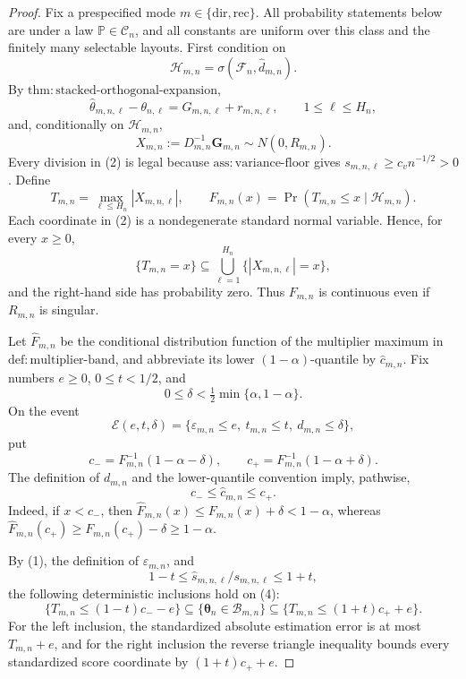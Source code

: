\documentclass{article}
\begin{document}
\begin{proof}
Fix a prespecified mode \(m\in\{\mathrm{dir},\mathrm{rec}\}\).  All probability statements below are under a law \(\mathbb P\in\mathcal C_n\), and all constants are uniform over this class and the finitely many selectable layouts.  First condition on
\[
 \mathcal H_{m,n}=\sigma(\mathcal F_n,\widehat d_{m,n}).
\]
By \(\mathrm{thm{:}stacked\mbox{-}orthogonal\mbox{-}expansion}\),
\[
 \widehat\theta_{m,n,\ell}-\theta_{n,\ell}
 =G_{m,n,\ell}+r_{m,n,\ell},
 \qquad 1\le \ell\le H_n,                                      \tag{1}
\]
and, conditionally on \(\mathcal H_{m,n}\),
\[
 X_{m,n}:=D_{m,n}^{-1}\boldsymbol G_{m,n}
 \sim N(0,R_{m,n}).                                               \tag{2}
\]
Every division in (2) is legal because \(\mathrm{ass{:}variance\mbox{-}floor}\) gives \(s_{m,n,\ell}\ge c_vn^{-1/2}>0\).  Define
\[
 T_{m,n}=\max_{\ell\le H_n}|X_{m,n,\ell}|,
 \qquad
 F_{m,n}(x)=\Pr(T_{m,n}\le x\mid\mathcal H_{m,n}).               \tag{3}
\]
Each coordinate in (2) is a nondegenerate standard normal variable.  Hence, for every \(x\ge0\),
\[
 \{T_{m,n}=x\}\subseteq
 \bigcup_{\ell=1}^{H_n}\{|X_{m,n,\ell}|=x\},
\]
and the right-hand side has probability zero.  Thus \(F_{m,n}\) is continuous even if \(R_{m,n}\) is singular.

Let \(\widehat F_{m,n}\) be the conditional distribution function of the multiplier maximum in \(\mathrm{def{:}multiplier\mbox{-}band}\), and abbreviate its lower \((1-\alpha)\)-quantile by \(\widehat c_{m,n}\).  Fix numbers \(e\ge0\), \(0\le t<1/2\), and
\[
 0\le\delta<\tfrac12\min\{\alpha,1-\alpha\}.
\]
On the event
\[
 \mathcal E(e,t,\delta)=
 \{\varepsilon_{m,n}\le e,\ t_{m,n}\le t,\ d_{m,n}\le\delta\}, \tag{4}
\]
put
\[
 c_-=F_{m,n}^{-1}(1-\alpha-\delta),
 \qquad
 c_+=F_{m,n}^{-1}(1-\alpha+\delta).                               \tag{5}
\]
The definition of \(d_{m,n}\) and the lower-quantile convention imply, pathwise,
\[
 c_-\le\widehat c_{m,n}\le c_+.                                  \tag{6}
\]
Indeed, if \(x<c_-\), then \(\widehat F_{m,n}(x)\le F_{m,n}(x)+\delta<1-\alpha\), whereas \(\widehat F_{m,n}(c_+)\ge F_{m,n}(c_+)-\delta\ge1-\alpha\).

By (1), the definition of \(\varepsilon_{m,n}\), and
\[
 1-t\le \widehat s_{m,n,\ell}/s_{m,n,\ell}\le1+t,
\]
the following deterministic inclusions hold on (4):
\[
 \{T_{m,n}\le(1-t)c_- -e\}
 \subseteq\{\boldsymbol\theta_n\in\mathcal B_{m,n}\}
 \subseteq\{T_{m,n}\le(1+t)c_+ +e\}.                             \tag{7}
\]
For the left inclusion, the standardized absolute estimation error is at most \(T_{m,n}+e\), and for the right inclusion the reverse triangle inequality bounds every standardized score coordinate by \((1+t)c_++e\).


\end{proof}
\end{document}
